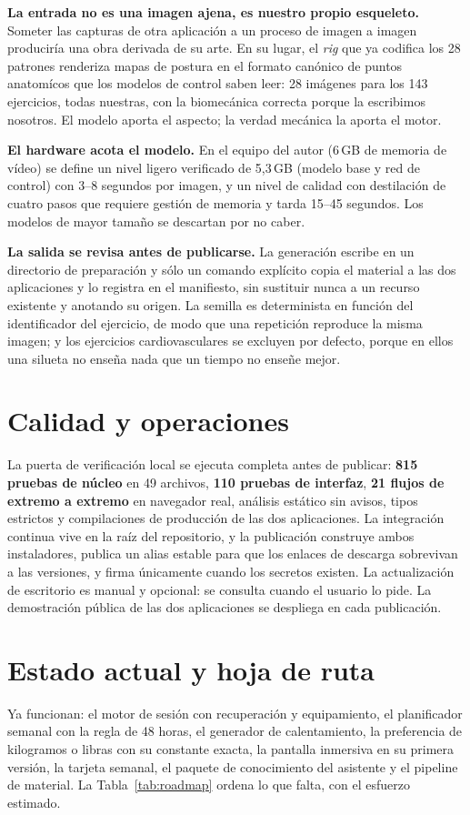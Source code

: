 \documentclass[conference]{IEEEtran}
\begin{document}
\textbf{La entrada no es una imagen ajena, es nuestro propio esqueleto.} Someter
las capturas de otra aplicaci\'on a un proceso de imagen a imagen producir\'ia
una obra derivada de su arte. En su lugar, el \emph{rig} que ya codifica los 28
patrones renderiza mapas de postura en el formato can\'onico de puntos
anatom\'icos que los modelos de control saben leer: 28 im\'agenes para los 143
ejercicios, todas nuestras, con la biomec\'anica correcta porque la escribimos
nosotros. El modelo aporta el aspecto; la verdad mec\'anica la aporta el motor.

\textbf{El hardware acota el modelo.} En el equipo del autor (6\,GB de memoria de
v\'ideo) se define un nivel ligero verificado de 5{,}3\,GB (modelo base y red de
control) con 3--8 segundos por imagen, y un nivel de calidad con destilaci\'on de
cuatro pasos que requiere gesti\'on de memoria y tarda 15--45 segundos. Los
modelos de mayor tama\~no se descartan por no caber.

\textbf{La salida se revisa antes de publicarse.} La generaci\'on escribe en un
directorio de preparaci\'on y s\'olo un comando expl\'icito copia el material a
las dos aplicaciones y lo registra en el manifiesto, sin sustituir nunca a un
recurso existente y anotando su origen. La semilla es determinista en funci\'on
del identificador del ejercicio, de modo que una repetici\'on reproduce la misma
imagen; y los ejercicios cardiovasculares se excluyen por defecto, porque en
ellos una silueta no ense\~na nada que un tiempo no enseñe mejor.

\section{Calidad y operaciones}
La puerta de verificaci\'on local se ejecuta completa antes de publicar:
\textbf{815 pruebas de n\'ucleo} en 49 archivos, \textbf{110 pruebas de interfaz},
\textbf{21 flujos de extremo a extremo} en navegador real, an\'alisis est\'atico
sin avisos, tipos estrictos y compilaciones de producci\'on de las dos
aplicaciones. La integraci\'on continua vive en la ra\'iz del repositorio, y la
publicaci\'on construye ambos instaladores, publica un alias estable para que los
enlaces de descarga sobrevivan a las versiones, y firma \'unicamente cuando los
secretos existen. La actualizaci\'on de escritorio es manual y opcional: se
consulta cuando el usuario lo pide. La demostraci\'on p\'ublica de las dos
aplicaciones se despliega en cada publicaci\'on.

\section{Estado actual y hoja de ruta}
Ya funcionan: el motor de sesi\'on con recuperaci\'on y equipamiento, el
planificador semanal con la regla de 48 horas, el generador de calentamiento, la
preferencia de kilogramos o libras con su constante exacta, la pantalla inmersiva
en su primera versi\'on, la tarjeta semanal, el paquete de conocimiento del
asistente y el pipeline de material. La Tabla~\ref{tab:roadmap} ordena lo que
falta, con el esfuerzo estimado.
\end{document}
